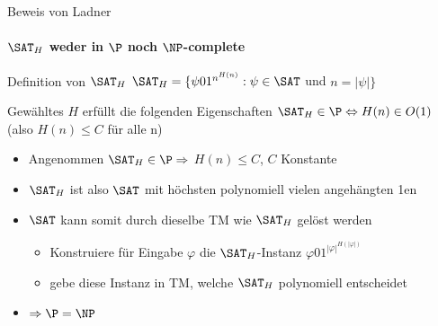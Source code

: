 % 				
% 		
% 	
% 	
\begin{frame}{Beweis von Ladner}
	\framesubtitle{${\SAT}_H$ weder in $\P$ noch  $\NP$-complete}
	\begin{KITinfoblock}{Definition von ${\SAT}_H$} 	
		${\SAT}_H = \lbrace \psi 01^{n^{H(n)}} : \psi \in \SAT$ und $ n = |\psi| \rbrace$
	\end{KITinfoblock}
	\begin{KITblock}{Gewähltes $H$ erfüllt die folgenden Eigenschaften}
			${\SAT}_H \in \P \Leftrightarrow H(n) \in O(1)$ (also $H(n) \leq C$ f\"ur alle n) 		
	\end{KITblock}
	\pause
	\bigskip
	\pause
	\bigskip
	\begin{itemize}[<+->]
		\item Angenommen ${\SAT}_H \in \P \Rightarrow $  $H(n) \le C$, $C$ Konstante
		\item ${\SAT}_H$ ist also $\SAT$  mit höchsten polynomiell vielen  angehängten 1en
		\item $\SAT$ kann somit durch dieselbe TM wie ${\SAT}_H$ gelöst werden
			\begin{itemize}
				\item Konstruiere für Eingabe $\varphi$ die ${\SAT}_H$-Instanz $\varphi01^{|\varphi|^{H(|\varphi|)}}$ 
				\item gebe diese Instanz in TM, welche ${\SAT}_H$ polynomiell entscheidet
			\end{itemize}
			\item $\Rightarrow \P = \NP$
	\end{itemize}
	
\end{frame}

